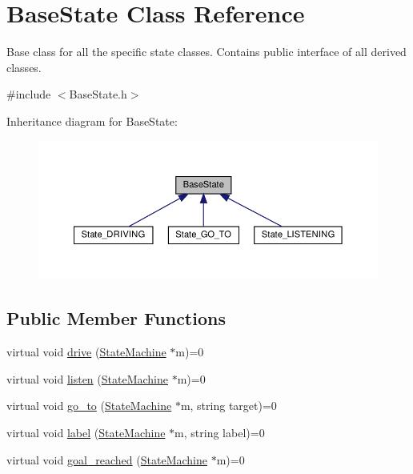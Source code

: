 \hypertarget{class_base_state}{}\section{Base\+State Class Reference}
\label{class_base_state}


Base class for all the specific state classes. Contains public interface of all derived classes.  




{\ttfamily \#include $<$Base\+State.\+h$>$}



Inheritance diagram for Base\+State\+:\nopagebreak
\begin{figure}[H]
\begin{center}
\leavevmode
\includegraphics[width=350pt]{class_base_state__inherit__graph}
\end{center}
\end{figure}
\subsection*{Public Member Functions}
\begin{DoxyCompactItemize}
\item 
virtual void \hyperlink{class_base_state_a398bc67a0353c3e8da1597dbdbbba2cc}{drive} (\hyperlink{class_state_machine}{State\+Machine} $\ast$m)=0
\item 
virtual void \hyperlink{class_base_state_ac65db46601f60cd025ff058dae117d7c}{listen} (\hyperlink{class_state_machine}{State\+Machine} $\ast$m)=0
\item 
virtual void \hyperlink{class_base_state_a6acb02c9d6b3e54602e163dc1848ac3a}{go\+\_\+to} (\hyperlink{class_state_machine}{State\+Machine} $\ast$m, string target)=0
\item 
virtual void \hyperlink{class_base_state_a9b21ace3d89308945fdecd81b34d3919}{label} (\hyperlink{class_state_machine}{State\+Machine} $\ast$m, string label)=0
\item 
virtual void \hyperlink{class_base_state_aafa71e762d651f1f5a1f7a6decd0d3b5}{goal\+\_\+reached} (\hyperlink{class_state_machine}{State\+Machine} $\ast$m)=0
\end{DoxyCompactItemize}


